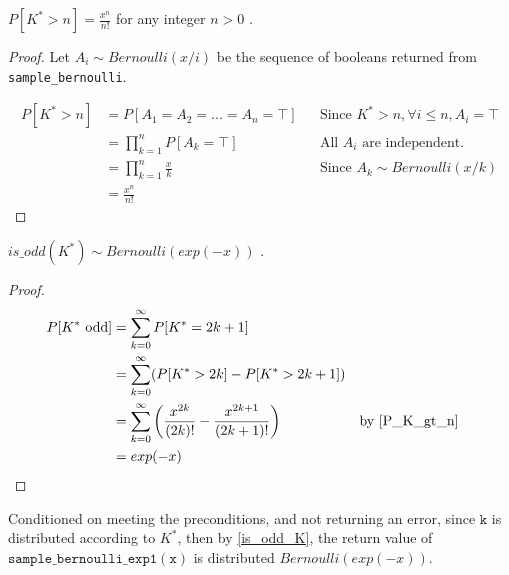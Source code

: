 \documentclass{article}
\begin{document}
\begin{lemma}
\label{P_K_gt_n}
$P[K^{*} > n] = \frac{x^n}{n!}$ for any integer $n > 0$ \cite{CKS20}.
\end{lemma}

\begin{proof}
Let $A_i \sim Bernoulli(x/i)$ be the sequence of booleans returned from \texttt{sample\_bernoulli}.

\begin{align*}
    P[K^{*} > n] &= P[A_1 = A_2 = ... = A_n = \top] && \text{Since } K^{*} > n, \forall i \leq n, A_i = \top \\
    &= \prod_{k=1}^n P[A_k = \top] && \text{All $A_i$ are independent.} \\
    &= \prod_{k=1}^n \frac{x}{k} && \text{Since $A_k \sim Bernoulli(x/k)$} \\
    &= \frac{x^n}{n!}
\end{align*}
\end{proof}

\begin{theorem}
\label{is_odd_K}
$is\_odd(K^{*}) \sim Bernoulli(exp(-x))$ \cite{CKS20}.
\end{theorem}

\begin{proof}
\begin{align*}
P[K^{*} \text{ odd}] &= \sum_{k=0}^\infty P[K^{*} = 2k + 1] \\
&= \sum_{k=0}^\infty (P[K^{*} > 2k] - P[K^{*} > 2k + 1]) \\
&= \sum_{k=0}^\infty \left(\frac{x^{2k}}{(2k)!} - \frac{x^{2k + 1}}{(2k + 1)!}\right) && \text{by } \ref{P_K_gt_n} \\
&= exp(-x)
\end{align*}

\end{proof}

Conditioned on meeting the preconditions, and not returning an error, 
since $\mathtt{k}$ is distributed according to $K^{*}$, then by \ref{is_odd_K}, 
the return value of $\mathtt{sample\_bernoulli\_exp1(x)}$ is distributed $Bernoulli(exp(-x))$.



\end{document}
